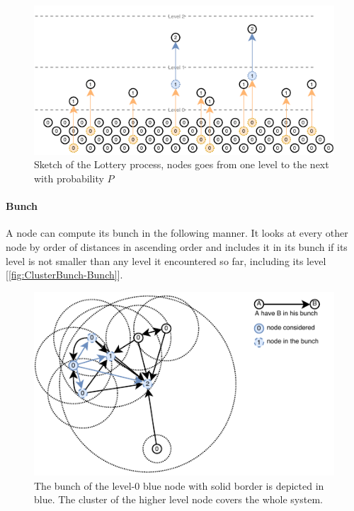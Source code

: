 \documentclass[a4paper,11pt,twoside=semi,openright]{report}
\begin{document}
\begin{figure}[!h] 
\centering
\includegraphics[width=400pt]{figures/Lottery-Standard}
\caption{Sketch of the Lottery process, nodes goes from one level to the next
  with probability $P$} \label{fig:ClusterBunch-Bunch}
\end{figure}

\paragraph{Bunch} A node can compute its bunch in the following manner. It
looks at every other node by order of distances in ascending order and
includes it in its bunch if its level is not smaller than any level it encountered
so far, including its level [\autoref{fig:ClusterBunch-Bunch}]. 

\begin{figure}[!h] 
\centering
\includegraphics[width=350pt]{figures/ClusterBunch-Bunch}
\caption{The bunch of the  level-0 blue node with solid border is depicted in
    blue. The cluster of the higher level node covers the whole system.}
    \label{fig:ClusterBunch-Bunch}
\end{figure}
\end{document}
